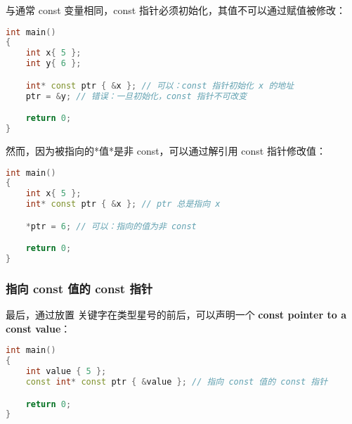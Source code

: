 \documentclass[../../LearnCpp.tex]{subfiles}
\begin{document}
与通常 const 变量相同，const 指针必须初始化，其值不可以通过赋值被修改：

\begin{lstlisting}[language=C++]
int main()
{
    int x{ 5 };
    int y{ 6 };

    int* const ptr { &x }; // 可以：const 指针初始化 x 的地址
    ptr = &y; // 错误：一旦初始化，const 指针不可改变

    return 0;
}
\end{lstlisting}

然而，因为被指向的*值*是非 const，可以通过解引用 const 指针修改值：

\begin{lstlisting}[language=C++]
int main()
{
    int x{ 5 };
    int* const ptr { &x }; // ptr 总是指向 x

    *ptr = 6; // 可以：指向的值为非 const

    return 0;
}
\end{lstlisting}

\subsubsection*{指向 const 值的 const 指针}

最后，通过放置  关键字在类型星号的前后，可以声明一个 \textbf{const pointer to a const value}：

\begin{lstlisting}[language=C++]
int main()
{
    int value { 5 };
    const int* const ptr { &value }; // 指向 const 值的 const 指针

    return 0;
}
\end{lstlisting}
\end{document}
